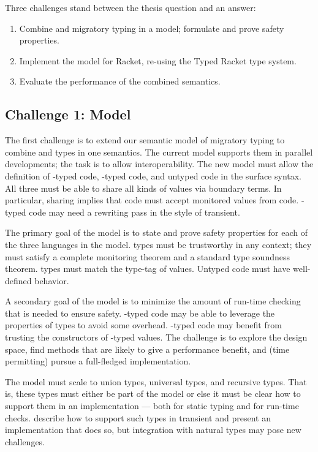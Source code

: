 Three challenges stand between the thesis question and an answer:

\begin{enumerate}
\item Combine \tdeep{} and \tshallow{} migratory typing in a model; formulate and prove safety properties.
\item Implement the model for Racket, re-using the Typed Racket type system.
\item Evaluate the performance of the combined semantics.
\end{enumerate}

\subsection{Challenge 1: Model}

The first challenge is to extend our semantic model of migratory typing to combine
 \tdeep{} and \tshallow{} types in one semantics.
The current model supports them in parallel developments; the task is to
 allow interoperability.
The new model must allow the definition of \tdeep{}-typed code,
 \tshallow{}-typed code, and untyped code in the surface syntax.
All three must be able to share all kinds of values via boundary terms.
In particular, sharing implies that \tshallow{} code must accept monitored
 values from \tdeep{} code.
\tDeep{}-typed code may need a rewriting pass in the style of transient.
 
The primary goal of the model is to state and prove safety properties for each
 of the three languages in the model.
\tDeep{} types must be trustworthy in any context; they must satisfy a complete
 monitoring theorem and a standard type soundness theorem.
\tShallow{} types must match the type-tag of values.
Untyped code must have well-defined behavior.

A secondary goal of the model is to minimize the amount of run-time checking
 that is needed to ensure safety.
\tShallow{}-typed code may be able to leverage the properties of \tdeep{} types
 to avoid some overhead.
\tDeep{}-typed code may benefit from trusting the constructors of \tshallow{}-typed
 values.
The challenge is to explore the design space, find methods that are likely to
 give a performance benefit, and (time permitting) pursue a full-fledged implementation.

The model must scale to union types, universal types, and recursive types.
That is, these types must either be part of the model or else it must be clear
 how to support them in an implementation --- both for static typing and
 for run-time checks.
\citet{gf-icfp-2018} describe how to support such types in transient and
 present an implementation that does so, but integration with natural types
 may pose new challenges.


